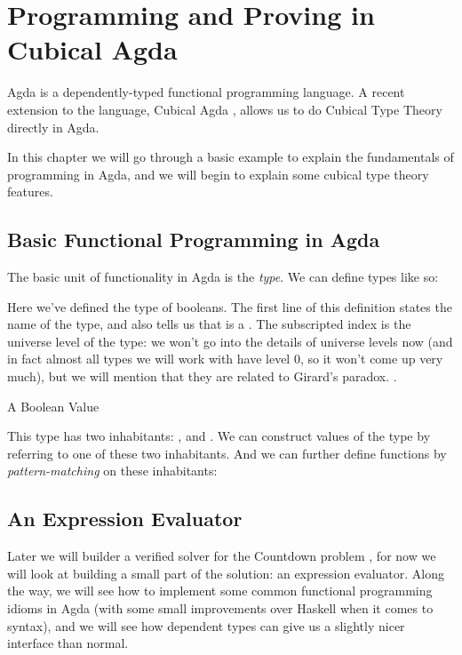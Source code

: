 \chapter{Programming and Proving in Cubical Agda}
Agda \cite{norellDependentlyTypedProgramming2008} is a dependently-typed
functional programming language.
A recent extension to the language, Cubical Agda
\cite{vezzosiCubicalAgdaDependently2019}, allows us to do Cubical Type Theory
directly in Agda.

In this chapter we will go through a basic example to explain the fundamentals
of programming in Agda, and we will begin to explain some cubical type theory
features.
\section{Basic Functional Programming in Agda}
The basic unit of functionality in Agda is the \emph{type}.
We can define types like so:
\begin{agdalisting}
\end{agdalisting}
Here we've defined the type of booleans.
The first line of this definition states the name of the type, and also tells us
that  is a .
The subscripted index is the universe level of the type: we won't go into the
details of universe levels now (and in fact almost all types we will work with
have level 0, so it won't come up very much), but we will mention that they are
related to Girard's paradox.
\cite{girardInterpretationFonctionelleElimination1972}.

\begin{marginagdalisting}{A Boolean Value}
\end{marginagdalisting} 
This type has two inhabitants: , and
.
We can construct values of the type by referring to one of these two
inhabitants.
And we can further define functions by \emph{pattern-matching} on these
inhabitants:
\begin{agdalisting}
\end{agdalisting}
\section{An Expression Evaluator}
Later we will builder a verified solver for the Countdown problem
\cite{huttonCountdownProblem2002} , for
now we will look at building a small part of the solution: an expression
evaluator.
Along the way, we will see how to implement some common functional programming
idioms in Agda (with some small improvements over Haskell when it comes to
syntax), and we will see how dependent types can give us a slightly nicer
interface than normal.

